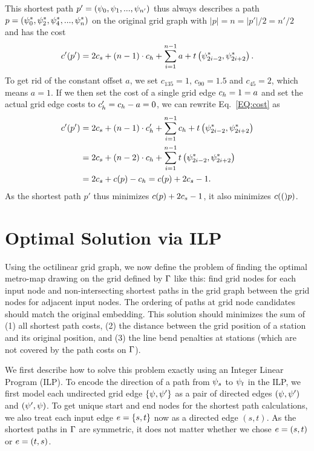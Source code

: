 \documentclass{sig-alternate-sigmod09}
\begin{document}
This shortest path $p' = (\psi_0, \psi_1, ..., \psi_{n'})$ thus always describes a path $p = (\psi^*_0, \psi^*_2, \psi^*_4, ..., \psi^*_{n})$ on the original grid graph with $|p| = n = |p'| / 2 = n' / 2$ and has the cost
%
\begin{align}
	c'(p') = 2 c_s + \left(n - 1\right) \cdot c_h + \sum_{i=1}^{n - 1} a + t\left(\psi^*_{2i - 2}, \psi^*_{2i+2}\right)\label{EQ:cost}.
\end{align}
%
To get rid of the constant offset $a$, we set $c_{135} = 1$, $c_{90} = 1.5$ and $c_{45} = 2$, which means $a = 1$.
If we then set the cost of a single grid edge $c_h = 1 = a$ and set the actual grid edge costs to $c'_h = c_h - a = 0$, we can rewrite Eq.~\ref{EQ:cost} as  
%
\begin{align}
	c'(p') &= 2 c_s +  \left(n - 1\right) \cdot c'_h + \sum_{i=1}^{n - 1} c_h + t\left(\psi^*_{2i - 2}, \psi^*_{2i+2}\right) \\
	     &= 2 c_s + \left(n - 2\right) \cdot c_h + \sum_{i=1}^{n - 1} t \left(\psi^*_{2i - 2}, \psi^*_{2i+2}\right) \\
	     &= 2 c_s + c(p) - c_h = c(p) + 2 c_s - 1.
\end{align}
%
As the shortest path $p'$ thus minimizes $c(p) + 2 c_s - 1$, it also minimizes $c(()p)$.

\section{Optimal Solution via ILP}

Using the octilinear grid graph, we now define the problem of finding the optimal metro-map drawing on the grid defined by $\Gamma$ like this: find grid nodes for each input node and non-intersecting shortest paths in the grid graph between the grid nodes for adjacent input nodes.
The ordering of paths at grid node candidates should match the original embedding.
This solution should minimizes the sum of (1) all shortest path costs, (2) the distance between the grid position of a station and its original position, and (3) the line bend penalties at stations (which are not covered by the path costs on $\Gamma$).

We first describe how to solve this problem exactly using an Integer Linear Program (ILP).
To encode the direction of a path from $\psi_s$ to $\psi_t$ in the ILP, we first model each undirected grid edge $\{\psi, \psi'\}$ as a pair of directed edges $(\psi, \psi')$ and $(\psi', \psi)$.
To get unique start and end nodes for the shortest path calculations, we also treat each input edge $e = \{s, t\}$ now as a directed edge $(s, t)$.
As the shortest paths in $\Gamma$ are symmetric, it does not matter whether we chose $e = (s, t)$ or $e = (t, s)$.
\end{document}
